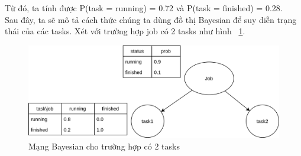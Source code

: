 \documentclass{my_style}
\begin{document}
\noindent
Từ đó, ta tính được P(task = running) = 0.72 và P(task = finished) = 0.28. \\
Sau đây, ta sẽ mô tả cách thức chúng ta dùng đồ thị Bayesian để suy diễn trạng thái của các tasks. Xét với trường hợp job có 2 tasks như hình ~\ref{fig:two_tasks}. \\
\begin{figure}[h!]
	\centering
	\includegraphics[scale=0.6]{images/two_tasks.png}
	\caption{Mạng Bayesian cho trường hợp có 2 tasks}
	\label{fig:two_tasks}
\end{figure}
\end{document}
